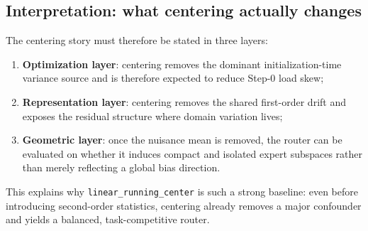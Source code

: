 \documentclass[11pt]{article}
\begin{document}
\subsection{Interpretation: what centering actually changes}
The centering story must therefore be stated in three layers:
\begin{enumerate}
    \item \textbf{Optimization layer}: centering removes the dominant initialization-time variance source and is therefore expected to reduce Step-0 load skew;
    \item \textbf{Representation layer}: centering removes the shared first-order drift and exposes the residual structure where domain variation lives;
    \item \textbf{Geometric layer}: once the nuisance mean is removed, the router can be evaluated on whether it induces compact and isolated expert subspaces rather than merely reflecting a global bias direction.
\end{enumerate}
This explains why \texttt{linear\_running\_center} is such a strong baseline: even before introducing second-order statistics, centering already removes a major confounder and yields a balanced, task-competitive router.
\end{document}
